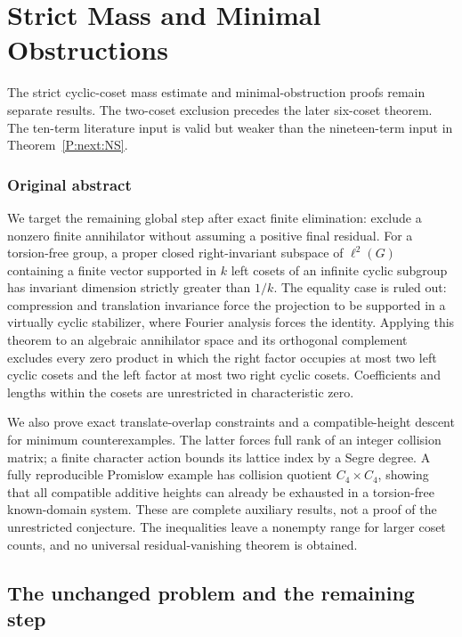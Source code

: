 \documentclass[11pt,a4paper,oneside]{report}
\theoremstyle{definition}
\theoremstyle{remark}
\newcommand{\compilationnote}[1]{\medskip\noindent{\small\color{accent}\textbf{Compilation note --- 23 November 2026.}}\par
{\small #1}\par\medskip}
\begin{document}
\chapter{Strict Mass and Minimal Obstructions}\label{chap:M08}
\par
\compilationnote{The strict cyclic-coset mass estimate and minimal-obstruction proofs
remain separate results. The two-coset exclusion precedes the later
six-coset theorem. The ten-term literature input is valid but weaker
than the nineteen-term input in Theorem~\ref{P:next:NS}.}
\subsection*{Original abstract}
We target the remaining global step after exact finite elimination:
exclude a nonzero finite annihilator without assuming a positive final
residual. For a torsion-free group, a proper closed right-invariant
subspace of $\ell^2(G)$ containing a finite vector supported in $k$
left cosets of an infinite cyclic subgroup has invariant dimension
strictly greater than $1/k$. The equality case is ruled out: compression
and translation invariance force the projection to be supported in a
virtually cyclic stabilizer, where Fourier analysis forces the identity.
Applying this theorem to an algebraic annihilator space and its
orthogonal complement excludes every zero product in which the right
factor occupies at most two left cyclic cosets and the left factor at
most two right cyclic cosets. Coefficients and lengths within the cosets
are unrestricted in characteristic zero.

We also prove exact translate-overlap constraints and a compatible-height
descent for minimum counterexamples. The latter forces full rank of an
integer collision matrix; a finite character action bounds its lattice
index by a Segre degree. A fully reproducible Promislow example has
collision quotient $C_4\times C_4$, showing that all compatible additive
heights can already be exhausted in a torsion-free known-domain system.
These are complete auxiliary results, not a proof of the unrestricted
conjecture. The inequalities leave a nonempty range for larger coset
counts, and no universal residual-vanishing theorem is obtained.
\medskip
\section{The unchanged problem and the remaining step}
\end{document}
